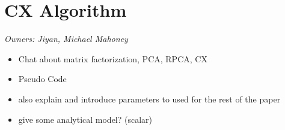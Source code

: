 \section{CX Algorithm}
\textit{Owners: Jiyan, Michael Mahoney}
\begin{itemize}

  \item Chat about matrix factorization, PCA, RPCA, CX 

  \item Pseudo Code

  \item also explain and introduce parameters to used for the rest of the paper

  \item give some analytical model? (scalar)

\end{itemize}

